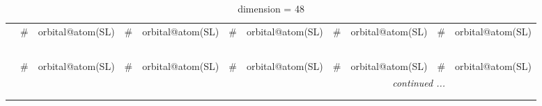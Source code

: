 \documentclass[fleqn,10pt,landscape]{jsarticle}
\begin{document}
\renewcommand{\arraystretch}{1.6}
\begin{longtable}[l]{c|cl|cl|cl|cl|cl}
\captionsetup{justification=raggedright, singlelinecheck=off}
\caption{dimension = 48}
 \\
 \hline \hline
 & \# & orbital@atom(SL) & \# & orbital@atom(SL) & \# & orbital@atom(SL) & \# & orbital@atom(SL) & \# & orbital@atom(SL) \\ \hline \endfirsthead

\multicolumn{10}{l}{\tablename\ \thetable{}} \\
 \hline \hline
 & \# & orbital@atom(SL) & \# & orbital@atom(SL) & \# & orbital@atom(SL) & \# & orbital@atom(SL) & \# & orbital@atom(SL) \\ \hline \endhead

 \hline \hline
\multicolumn{10}{r}{\footnotesize\it continued ...} \\ \endfoot

 \hline \hline
\multicolumn{10}{r}{} \\ \endlastfoot


\end{longtable}
\end{document}
